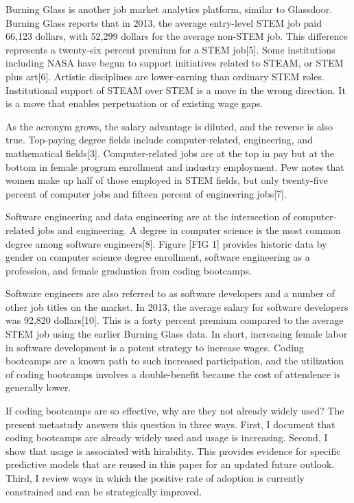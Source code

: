 \documentclass[review]{elsarticle}
\begin{document}
Burning Glass is another job market analytics platform, similar to Glassdoor.
Burning Glass reports that in 2013,
the average entry-level STEM job paid 66,123 dollars,
with 52,299 dollars for the average non-STEM job.
This difference represents a twenty-six percent premium for a STEM job[5].
Some institutions including NASA have begun to support initiatives related to STEAM, or STEM plus art[6].
Artistic disciplines are lower-earning than ordinary STEM roles.
Institutional support of STEAM over STEM is a move in the wrong direction.
It is a move that enables perpetuation or  of existing wage gaps.

As the acronym grows, the salary advantage is diluted, and the reverse is also true.
Top-paying degree fields include computer-related, engineering, and mathematical fields[3].
Computer-related jobs are at the top in pay but at the bottom in female program enrollment and industry employment.
Pew notes that women make up half of those employed in STEM fields,
but only twenty-five percent of computer jobs
and fifteen percent of engineering jobs[7].

Software engineering and data engineering are at the intersection of computer-related jobs and engineering.
A degree in computer science is the most common degree among software engineers[8].
Figure [FIG 1] provides historic data by gender on computer science degree enrollment,
software engineering as a profession,
and female graduation from coding bootcamps.

Software engineers are also referred to as software developers and a number of other job titles on the market.
In 2013, the average salary for software developers was 92,820 dollars[10].
This is a forty percent premium compared to the average STEM job using the earlier Burning Glass data.
In short, increasing female labor in software development is a potent strategy to increase wages.
Coding bootcamps are a known path to such increased participation, and the utilization of coding bootcamps
involves a double-benefit because the cost of attendence is generally lower.

If coding bootcamps are so effective, why are they not already widely used?
The present metastudy answers this question in three ways.
First, I document that coding bootcamps are already widely used and usage is increasing.
Second, I show that usage is associated with hirability.
This provides evidence for specific predictive models that are reused in this paper for an updated future outlook.
Third, I review ways in which the positive rate of adoption is currently constrained and can be strategically improved.
\end{document}
